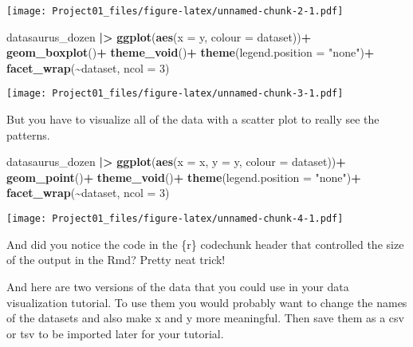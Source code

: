 \documentclass[
]{article}
\newenvironment{Shaded}{\begin{snugshade}}{\end{snugshade}}
\newcommand{\AttributeTok}[1]{\textcolor[rgb]{0.13,0.29,0.53}{#1}}
\newcommand{\DecValTok}[1]{\textcolor[rgb]{0.00,0.00,0.81}{#1}}
\newcommand{\FunctionTok}[1]{\textcolor[rgb]{0.13,0.29,0.53}{\textbf{#1}}}
\newcommand{\NormalTok}[1]{#1}
\newcommand{\SpecialCharTok}[1]{\textcolor[rgb]{0.81,0.36,0.00}{\textbf{#1}}}
\newcommand{\StringTok}[1]{\textcolor[rgb]{0.31,0.60,0.02}{#1}}
\begin{document}
\texttt{[image: Project01\_files/figure-latex/unnamed-chunk-2-1.pdf]}

\begin{Shaded}
\begin{Highlighting}[]
\NormalTok{datasaurus\_dozen }\SpecialCharTok{|\textgreater{}}
  \FunctionTok{ggplot}\NormalTok{(}\FunctionTok{aes}\NormalTok{(}\AttributeTok{x =}\NormalTok{ y, }\AttributeTok{colour =}\NormalTok{ dataset))}\SpecialCharTok{+}
    \FunctionTok{geom\_boxplot}\NormalTok{()}\SpecialCharTok{+}
    \FunctionTok{theme\_void}\NormalTok{()}\SpecialCharTok{+}
    \FunctionTok{theme}\NormalTok{(}\AttributeTok{legend.position =} \StringTok{"none"}\NormalTok{)}\SpecialCharTok{+}
    \FunctionTok{facet\_wrap}\NormalTok{(}\SpecialCharTok{\textasciitilde{}}\NormalTok{dataset, }\AttributeTok{ncol =} \DecValTok{3}\NormalTok{)}
\end{Highlighting}
\end{Shaded}

\texttt{[image: Project01\_files/figure-latex/unnamed-chunk-3-1.pdf]}

But you have to visualize all of the data with a scatter plot to really
see the patterns.

\begin{Shaded}
\begin{Highlighting}[]
\NormalTok{datasaurus\_dozen }\SpecialCharTok{|\textgreater{}} 
  \FunctionTok{ggplot}\NormalTok{(}\FunctionTok{aes}\NormalTok{(}\AttributeTok{x =}\NormalTok{ x, }\AttributeTok{y =}\NormalTok{ y, }\AttributeTok{colour =}\NormalTok{ dataset))}\SpecialCharTok{+}
    \FunctionTok{geom\_point}\NormalTok{()}\SpecialCharTok{+}
    \FunctionTok{theme\_void}\NormalTok{()}\SpecialCharTok{+}
    \FunctionTok{theme}\NormalTok{(}\AttributeTok{legend.position =} \StringTok{"none"}\NormalTok{)}\SpecialCharTok{+}
    \FunctionTok{facet\_wrap}\NormalTok{(}\SpecialCharTok{\textasciitilde{}}\NormalTok{dataset, }\AttributeTok{ncol =} \DecValTok{3}\NormalTok{)}
\end{Highlighting}
\end{Shaded}

\texttt{[image: Project01\_files/figure-latex/unnamed-chunk-4-1.pdf]}

And did you notice the code in the \{r\} codechunk header that
controlled the size of the output in the Rmd? Pretty neat trick!

And here are two versions of the data that you could use in your data
visualization tutorial. To use them you would probably want to change
the names of the datasets and also make x and y more meaningful. Then
save them as a csv or tsv to be imported later for your tutorial.
\end{document}
